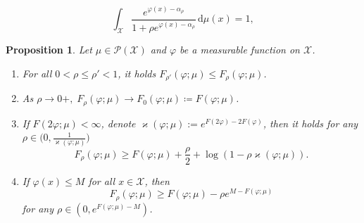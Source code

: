 \documentclass[10pt,a4paper]{amsart}
\newtheorem{proposition}{Proposition}
\newcommand{\Pspace}{\mathcal{P}}
\def\cX{\mathcal{X}}
\newcommand{\dd}{\,\mathrm{d}}
\newcommand*{\eqset}{\coloneqq}
\begin{document}
\begin{equation}\label{eq:opt_alpha_rho}
    \int_{\cX} \frac{e^{\varphi(x) - \alpha_{\rho}}}{1 + \rho e^{\varphi(x) - \alpha_{\rho}}} \dd \mu(x) = 1 ,
\end{equation}

\begin{proposition}\label{prop:approx}
    Let $\mu \in \Pspace(\cX)$ and $\varphi$ be a measurable function on $\cX$.
    \begin{enumerate}[label=(\roman*),noitemsep,nolistsep,leftmargin=*]
    \item\label{monot} For all $0 < \rho \le \rho' < 1$, it holds $F_{\rho'}(\varphi ; \mu) \le F_\rho(\varphi ; \mu)$.
    \item\label{lim} As $\rho \to 0+,\; F_\rho(\varphi ; \mu) \to F_0(\varphi ; \mu) \eqset F(\varphi ; \mu)$.
    \item\label{alpha_and_lower_bounds} If $F(2 \varphi; \mu) < \infty$, denote $\varkappa(\varphi ; \mu):=e^{F(2\varphi) - 2F(\varphi)}$, then it holds for any $\rho \in \bigl(0,\frac{1}{\varkappa(\varphi ; \mu)}\bigr)$
    \begin{equation}\label{eq:lower_bound}
        F_\rho(\varphi ; \mu) \ge F(\varphi; \mu) + \frac{\rho}{2} +\log(1-\rho \varkappa(\varphi ; \mu)) .
    \end{equation}
    \item\label{lower_bound_with_max} If $\varphi(x) \le M$ for all $x \in \cX$, then $$F_\rho(\varphi ; \mu) \ge F(\varphi; \mu) - \rho e^{M - F(\varphi; \mu)}$$ for any $\rho \in \left( 0, e^{F(\varphi; \mu) - M} \right)$.
    \end{enumerate}
\end{proposition}
\end{document}
